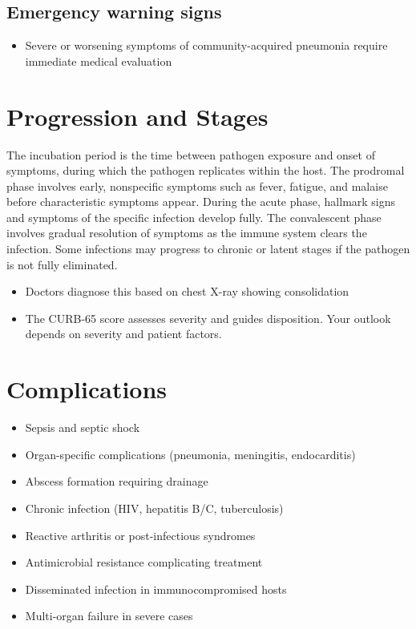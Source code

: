\subsection{Emergency warning signs}
\begin{itemize}[noitemsep]
  \item Severe or worsening symptoms of community-acquired pneumonia require immediate medical evaluation
\end{itemize}
\section{Progression and Stages}
The incubation period is the time between pathogen exposure and onset of symptoms, during which the pathogen replicates within the host. The prodromal phase involves early, nonspecific symptoms such as fever, fatigue, and malaise before characteristic symptoms appear. During the acute phase, hallmark signs and symptoms of the specific infection develop fully. The convalescent phase involves gradual resolution of symptoms as the immune system clears the infection. Some infections may progress to chronic or latent stages if the pathogen is not fully eliminated.

\begin{itemize}[noitemsep]
  \item Doctors diagnose this based on chest X-ray showing consolidation
  \item The CURB-65 score assesses severity and guides disposition. Your outlook depends on severity and patient factors.
\end{itemize}
\section{Complications}
\begin{itemize}[noitemsep]
  \item Sepsis and septic shock
  \item Organ-specific complications (pneumonia, meningitis, endocarditis)
  \item Abscess formation requiring drainage
  \item Chronic infection (HIV, hepatitis B/C, tuberculosis)
  \item Reactive arthritis or post-infectious syndromes
  \item Antimicrobial resistance complicating treatment
  \item Disseminated infection in immunocompromised hosts
  \item Multi-organ failure in severe cases
\end{itemize}
